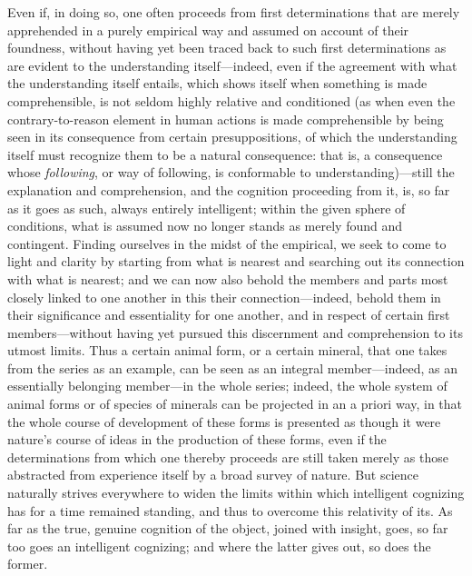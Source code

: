 \documentclass[12pt,a4paper]{book}
\begin{document}
Even if, in doing so, one often proceeds from first determinations that are merely
apprehended in a purely empirical way and assumed on account of their foundness,
without having yet been traced back to such first determinations as are evident to
the understanding itself---indeed, even if the agreement with what the
understanding itself entails, which shows itself when something is made
comprehensible, is not seldom highly relative and conditioned (as when even the
contrary-to-reason element in human actions is made comprehensible by being seen
in its consequence from certain presuppositions, of which the understanding itself
must recognize them to be a natural consequence: that is, a consequence whose
\emph{following}, or way of following, is conformable to understanding)---still the
explanation and comprehension, and the cognition proceeding from it, is, so far as
it goes as such, always entirely intelligent; within the given sphere of
conditions, what is assumed now no longer stands as merely found and contingent.
Finding ourselves in the midst of the empirical, we seek to come to light and
clarity by starting from what is nearest and searching out its connection with
what is nearest; and we can now also behold the members and parts most closely
linked to one another in this their connection---indeed, behold them in their
significance and essentiality for one another, and in respect of certain first
members---without having yet pursued this discernment and comprehension to its
utmost limits. Thus a certain animal form, or a certain mineral, that one takes
from the series as an example, can be seen as an integral member---indeed, as an
essentially belonging member---in the whole series; indeed, the whole system of
animal forms or of species of minerals can be projected in an a priori way, in
that the whole course of development of these forms is presented as though it were
nature's course of ideas in the production of these forms, even if the
determinations from which one thereby proceeds are still taken merely as those
abstracted from experience itself by a broad survey of nature. But science
naturally strives everywhere to widen the limits within which intelligent
cognizing has for a time remained standing, and thus to overcome this relativity
of its. As far as the true, genuine cognition of the object, joined with insight,
goes, so far too goes an intelligent cognizing; and where the latter gives out, so
does the former.
\end{document}
